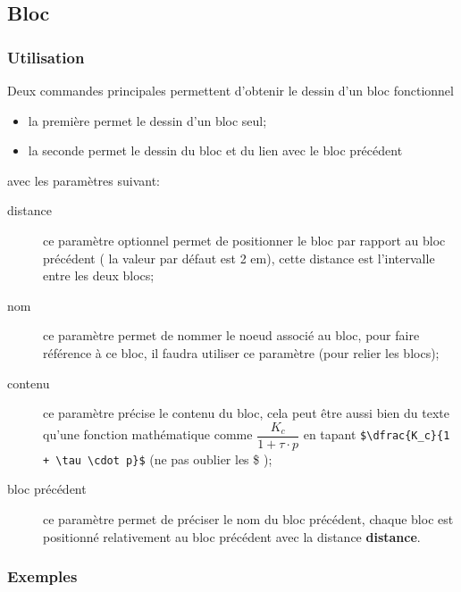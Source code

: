 \documentclass[a4paper,11pt]{article}                      %
\begin{document}
\subsection{Bloc}

\subsubsection {Utilisation}
Deux commandes principales permettent d'obtenir le dessin d'un bloc fonctionnel
\begin{itemize}
\item la première permet le dessin d'un bloc seul;
 
    
    
\item la seconde permet le dessin du bloc et du lien avec le bloc précédent
 
   
\end{itemize}

 avec les paramètres suivant:

\begin{description}
\item [distance] ce paramètre optionnel permet de positionner le bloc par rapport au bloc précédent ( la valeur par défaut est 2 em), cette distance est l'intervalle entre les deux blocs;
\item [nom] ce paramètre  permet de nommer le noeud associé au bloc, pour faire référence à ce bloc, il faudra utiliser ce paramètre (pour relier les blocs);
\item [contenu] ce paramètre précise le contenu du bloc, cela peut être aussi bien du texte qu'une fonction mathématique comme $\dfrac{K_c}{1 + \tau \cdot p}$ en tapant \verb"$\dfrac{K_c}{1 + \tau \cdot p}$" (ne pas oublier les \$ );
\item[bloc précédent] ce paramètre permet de préciser le nom du bloc précédent, chaque bloc est positionné relativement au bloc précédent avec la distance \textbf{distance}.
\end{description}


\subsubsection{Exemples}
\end{document}
